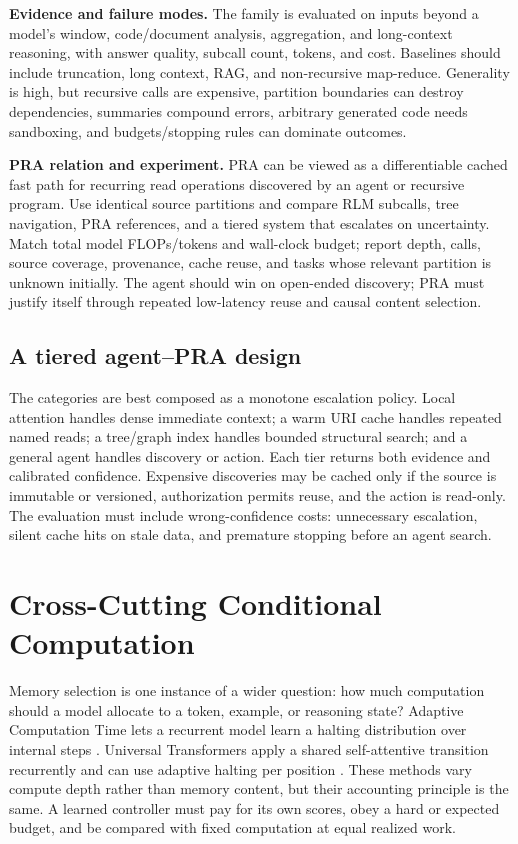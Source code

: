 \textbf{Evidence and failure modes.} The family is evaluated on inputs beyond a model's
window, code/document analysis, aggregation, and long-context reasoning, with answer quality,
subcall count, tokens, and cost.  Baselines should include truncation, long context, RAG, and
non-recursive map-reduce.  Generality is high, but recursive calls are expensive, partition
boundaries can destroy dependencies, summaries compound errors, arbitrary generated code
needs sandboxing, and budgets/stopping rules can dominate outcomes.

\textbf{PRA relation and experiment.} PRA can be viewed as a differentiable cached fast path
for recurring read operations discovered by an agent or recursive program.  Use identical
source partitions and compare RLM subcalls, tree navigation, PRA references, and a tiered
system that escalates on uncertainty.  Match total model FLOPs/tokens and wall-clock budget;
report depth, calls, source coverage, provenance, cache reuse, and tasks whose relevant
partition is unknown initially.  The agent should win on open-ended discovery; PRA must
justify itself through repeated low-latency reuse and causal content selection.

\subsection{A tiered agent--PRA design}

The categories are best composed as a monotone escalation policy.  Local attention handles
dense immediate context; a warm URI cache handles repeated named reads; a tree/graph index
handles bounded structural search; and a general agent handles discovery or action.  Each
tier returns both evidence and calibrated confidence.  Expensive discoveries may be cached
only if the source is immutable or versioned, authorization permits reuse, and the action is
read-only.  The evaluation must include wrong-confidence costs: unnecessary escalation,
silent cache hits on stale data, and premature stopping before an agent search.


\section{Cross-Cutting Conditional Computation}

Memory selection is one instance of a wider question: how much computation should a model
allocate to a token, example, or reasoning state? Adaptive Computation Time lets a recurrent
model learn a halting distribution over internal steps \citep{graves2016adaptive}. Universal
Transformers apply a shared self-attentive transition recurrently and can use adaptive
halting per position \citep{dehghani2019universal}. These methods vary compute depth rather
than memory content, but their accounting principle is the same. A learned controller must
pay for its own scores, obey a hard or expected budget, and be compared with fixed computation
at equal realized work.

